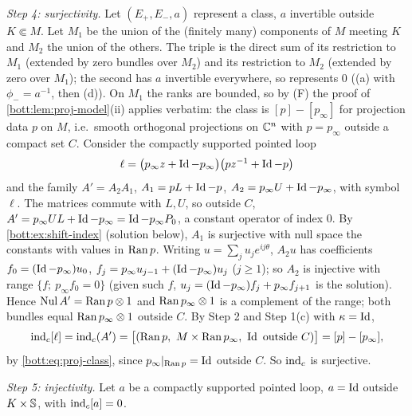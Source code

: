\emph{Step 4: surjectivity.} Let $(E_+,E_-,a)$ represent a class, $a$ invertible outside
$K\Subset M$. Let $M_1$ be the union of the (finitely many) components of $M$ meeting $K$ and
$M_2$ the union of the others. The triple is the direct sum of its restriction to $M_1$
(extended by zero bundles over $M_2$) and its restriction to $M_2$ (extended by zero over
$M_1$); the second has $a$ invertible everywhere, so represents $0$ ((a) with
$\phi_-=a^{-1}$, then (d)). On $M_1$ the ranks are bounded, so by (F) the proof of
\cref{bott:lem:proj-model}(ii) applies verbatim: the class is $[p]-[p_\infty]$ for projection
data $p$ on $M$, i.e.\ smooth orthogonal projections on $\mathbb{C}^n$ with $p=p_\infty$ outside a
compact set $C$. Consider the compactly supported pointed loop
\begin{equation*}
  \ell=\bigl(p_\infty z+\operatorname{Id}-p_\infty\bigr)\bigl(pz^{-1}+\operatorname{Id}-p\bigr)
\end{equation*}
and the family $A'=A_2A_1$, $A_1=pL+\operatorname{Id}-p$, $A_2=p_\infty U+\operatorname{Id}-p_\infty$, with symbol
$\ell$. The matrices commute with $L,U$, so outside $C$,
$A'=p_\infty UL+\operatorname{Id}-p_\infty=\operatorname{Id}-p_\infty P_0$, a constant operator of index $0$. By
\cref{bott:ex:shift-index} (solution below), $A_1$ is surjective with null space the
constants with values in $\operatorname{Ran} p$. Writing $u=\sum_ju_je^{ij\theta}$, $A_2u$ has coefficients
$f_0=(\operatorname{Id}-p_\infty)u_0$, $f_j=p_\infty u_{j-1}+(\operatorname{Id}-p_\infty)u_j$ ($j\ge1$); so $A_2$ is
injective with range $\{f;\ p_\infty f_0=0\}$ (given such $f$, $u_j=(\operatorname{Id}-p_\infty)f_j+p_\infty
f_{j+1}$ is the solution). Hence $\operatorname{Nul} A'=\operatorname{Ran} p\otimes1$ and $\operatorname{Ran} p_\infty\otimes1$ is a
complement of the range; both bundles equal $\operatorname{Ran} p_\infty\otimes1$ outside $C$. By Step 2 and
Step 1(c) with $\kappa=\operatorname{Id}$,
\begin{equation*}
  \ind_c[\ell]=\ind_c(A')=\bigl[(\Ran p,\ M\times\Ran p_\infty,\ \Id\text{ outside }C)\bigr]
  =[p]-[p_\infty],
\end{equation*}
by \eqref{bott:eq:proj-class}, since $p_\infty|_{\operatorname{Ran} p}=\operatorname{Id}$ outside $C$. So $\operatorname{ind}_c$ is
surjective.

\emph{Step 5: injectivity.} Let $a$ be a compactly supported pointed loop, $a=\operatorname{Id}$ outside
$K\times\mathbb{S}$, with $\operatorname{ind}_c[a]=0$.

